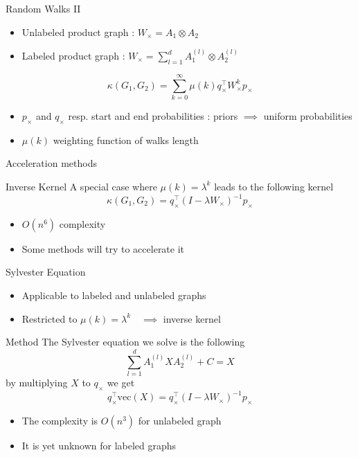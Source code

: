 \documentclass[compress]{beamer}
\begin{document}
\begin{frame}{Random Walks II}
	\begin{itemize}
		\item Unlabeled product graph : $W_{\times}=A_1\otimes A_2$
		\item Labeled product graph : $W_{\times}=\sum\limits_{l=1}^{d} A_1^{(l)} \otimes A_2^{(l)}$
	\end{itemize}
	\begin{equation*}
	\kappa(G_1,G_2) = \sum\limits_{k=0}^{\infty}\mu(k)q_{\times}^{\top}W_{\times}^{k}p_{\times}
	\end{equation*}
	\begin{itemize}
		\item $p_\times$ and $q_\times$ resp. start and end probabilities : priors $\implies$ uniform probabilities
		\item $\mu(k)$ weighting function of walks length
	\end{itemize}
\end{frame}
\begin{frame}{Acceleration methods}
\begin{block}{Inverse Kernel}
A special case where $\mu(k)=\lambda^k$ leads to the following kernel
	\begin{equation*}
	\kappa(G_1,G_2)=q_{\times}^{\top}(I-\lambda W_\times)^{-1}p_{\times}
	\end{equation*}
\end{block}
\begin{itemize}
	\item $O(n^6)$ complexity
	\item Some methods will try to accelerate it
\end{itemize}
\end{frame}
\begin{frame}{Sylvester Equation}
\begin{itemize}
	\item Applicable to labeled and unlabeled graphs
	\item Restricted to $\mu(k)=\lambda^k\quad\implies$ inverse kernel
\end{itemize}
\begin{block}{Method}
	The Sylvester equation we solve is the following
	\begin{equation*}
	\sum\limits_{l=1}^{d}A_{1}^{(l)}XA_{2}^{(l)}+C=X
	\end{equation*}
	by multiplying $X$ to $q_\times$ we get 
	\begin{equation*}
		q_{\times}^{\top}\text{vec}(X)=q_{\times}^{\top}(I-\lambda W_{\times})^{-1}p_{\times}
	\end{equation*}
\end{block}
\begin{itemize}
	\item The complexity is $O(n^3)$ for unlabeled graph
	\item It is yet unknown for labeled graphs \citep{vishwanathan_graph_2010}
\end{itemize}
\end{frame}
\end{document}
